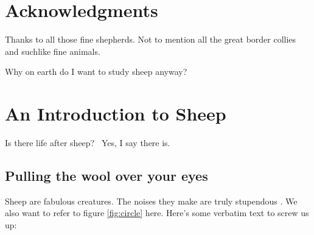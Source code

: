 \documentclass[proposal]{umassthesis}          %
\begin{document}
\chapter{Acknowledgments}             %
  Thanks to all those fine shepherds. Not to mention all the great
  border collies and suchlike fine animals.

\begin{abstract}                %
  Sheep like grass.  Why?  Let me tell you.  Sheep are ruminants, like
  cattle, deer, and horses.  They have stomachs that are specialized...
\end{abstract}



\tableofcontents                %
\listoftables                   %
\listoffigures                  %


\mainmatter   %

Why on earth do I want to study sheep anyway?

\chapter{An Introduction to Sheep}
Is there life after sheep?~\cite{xyz}  Yes, I say there is.%

\section{Pulling the wool over your eyes}

Sheep are fabulous creatures.  The noises they make are truly stupendous
\cite{Bah}.  We also want to refer to figure \ref{fig:circle} here.
Here's some verbatim text to screw us up:
\end{document}
